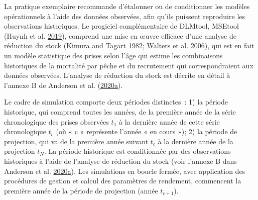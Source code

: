 \documentclass[11pt]{book}
\begin{document}
La pratique exemplaire recommande d'étalonner ou de conditionner les modèles opérationnels à l'aide des données observées, afin qu'ils puissent reproduire les observations historiques. Le progiciel complémentaire de DLMtool, MSEtool (Huynh et al. \protect\hyperlink{ref-huynh_msetool_2019}{2019}), comprend une mise en œuvre efficace d'une analyse de réduction du stock (Kimura and Tagart \protect\hyperlink{ref-kimura1982}{1982}; Walters et al. \protect\hyperlink{ref-walters2006}{2006}), qui est en fait un modèle statistique des prises selon l'âge qui estime les combinaisons historiques de la mortalité par pêche et du recrutement qui correspondraient aux données observées. L'analyse de réduction du stock est décrite en détail à l'annexe B de Anderson et al. (\protect\hyperlink{ref-anderson2020gfmp}{2020}\protect\hyperlink{ref-anderson2020gfmp}{a}).

Le cadre de simulation comporte deux périodes distinctes~: 1) la période historique, qui comprend toutes les années, de la première année de la série chronologique des prises observées \(t_1\) à la dernière année de cette série chronologique \(t_c\) (où « c » représente l'année « en cours »); 2) la période de projection, qui va de la première année suivant \(t_c\) à la dernière année de la projection \(t_N\). La période historique est conditionnée par des observations historiques à l'aide de l'analyse de réduction du stock (voir l'annexe B dans Anderson et al. \protect\hyperlink{ref-anderson2020gfmp}{2020}\protect\hyperlink{ref-anderson2020gfmp}{a}). Les simulations en boucle fermée, avec application des procédures de gestion et calcul des paramètres de rendement, commencent la première année de la période de projection (année \(t_{c+1}\)).
\end{document}
